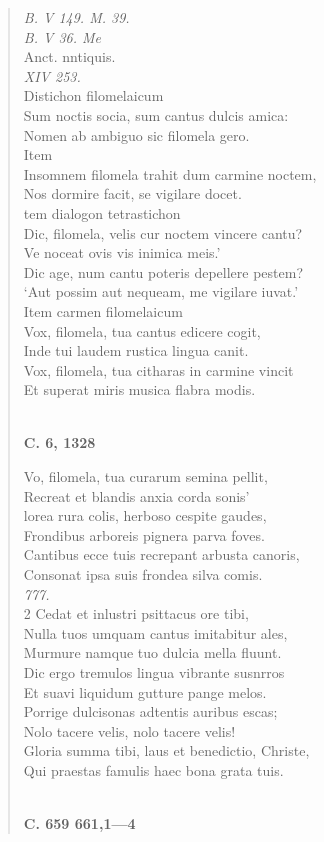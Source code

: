\documentclass[11pt, a4paper]{report}
\begin{document}
      \begin{verse}
      \textit{B. V 149. M. 39.} \\ \textit{B. V 36. Me} \\ Anct. nntiquis. \\ \textit{XIV 253.} \\ Distichon filomelaicum \\ Sum noctis socia, sum cantus dulcis amica: \\ Nomen ab ambiguo sic filomela gero. \\ Item \\ Insomnem filomela trahit dum carmine noctem, \\ Nos dormire facit, se vigilare docet. \\ tem dialogon tetrastichon \\ Dic, filomela, velis cur noctem vincere cantu? \\ Ve noceat ovis vis inimica meis.’ \\ Dic age, num cantu poteris depellere pestem? \\ ‘Aut possim aut nequeam, me vigilare iuvat.’ \\ Item carmen filomelaicum \\ Vox, filomela, tua cantus edicere cogit, \\ Inde tui laudem rustica lingua canit. \\ Vox, filomela, tua citharas in carmine vincit \\ Et superat miris musica flabra modis. \\ 
        ﻿\pagebreak 
    \begin{center} \textbf{C. 6, 1328} \end{center} \marginpar{[1]} Vo, filomela, tua curarum semina pellit, \\ Recreat et blandis anxia corda sonis’ \\ lorea rura colis, herboso cespite gaudes, \\ Frondibus arboreis pignera parva foves. \\ Cantibus ecce tuis recrepant arbusta canoris, \\ Consonat ipsa suis frondea silva comis. \\ \textit{777.} \\ 2 Cedat et inlustri psittacus ore tibi, \\ Nulla tuos umquam cantus imitabitur ales, \\ Murmure namque tuo dulcia mella fluunt. \\ Dic ergo tremulos lingua vibrante susnrros \\ Et suavi liquidum gutture pange melos. \\ Porrige dulcisonas adtentis auribus escas; \\ Nolo tacere velis, nolo tacere velis! \\ Gloria summa tibi, laus et benedictio, Christe, \\ Qui praestas famulis haec bona grata tuis. \\ 
        ﻿\pagebreak 
    \begin{center} \textbf{C. 659 661,1—4} \end{center} \marginpar{[132]} 
      \end{verse}
  
\end{document}
